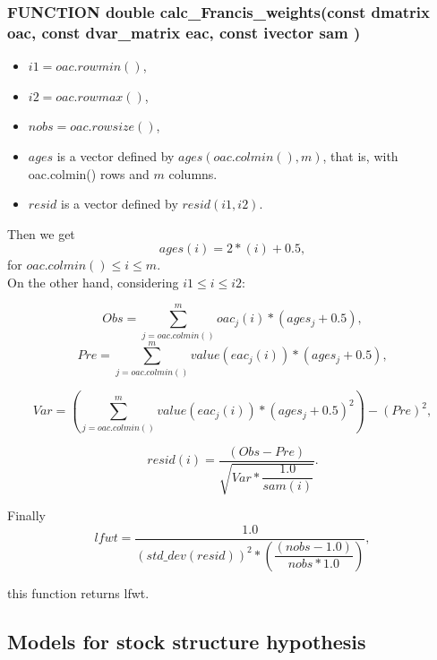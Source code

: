 \documentclass{article}
\begin{document}
\subsubsection{FUNCTION double calc\_Francis\_weights(const dmatrix oac, const dvar\_matrix eac, const ivector sam )}
\begin{itemize}
    \item $i1=oac.rowmin()$,
    \item $i2=oac.rowmax()$,
    \item $nobs = oac.rowsize()$,
    \item $ages$ is a vector defined by $ages(oac.colmin(),m)$, that is, with oac.colmin() rows and $m$ columns.
    \item $resid$ is a vector defined by $resid(i1,i2)$.
\end{itemize}
Then we get
\begin{equation}
    ages(i) = 2*(i) + 0.5,
\end{equation}
for  $oac.colmin() \leq i \leq m$.\\

On the other hand, considering $i1\leq i \leq i2$:

\begin{equation}
    Obs = \sum_{j=oac.colmin()}^{m}oac_j(i) * (ages_j+0.5),
\end{equation}
\begin{equation}
    Pre = \sum_{j=oac.colmin()}^m value(eac_j(i)) * (ages_j+ 0.5),
\end{equation}

\begin{equation}
    Var = \left(\sum_{j=oac.colmin()}^mvalue(eac_j(i)) * (ages_j+0.5)^2\right) - (Pre)^2,
\end{equation}


\begin{equation}
    resid(i) = \dfrac{(Obs - Pre)}{\sqrt{Var * \dfrac{1.0}{ sam(i) }}}.
\end{equation}

Finally
\begin{equation}
     lfwt = \dfrac{1.0}{ (std\_dev(resid))^2 * \left(\dfrac{(nobs - 1.0)}{nobs * 1.0}\right)},
\end{equation}

this function returns lfwt.

\subsection{Models for stock structure hypothesis}
\end{document}
